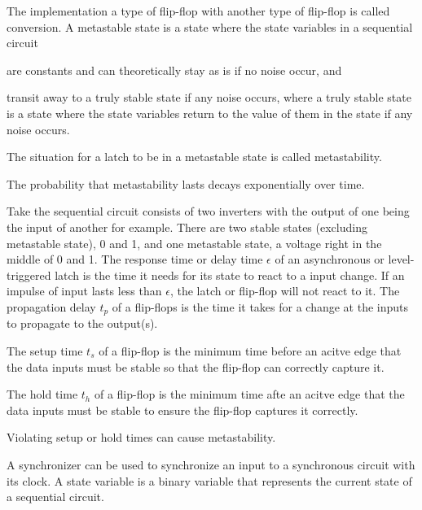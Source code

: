 \documentclass[a4paper,12pt]{report}
\begin{document}
The implementation a type of flip-flop with another type of flip-flop is called conversion.
A metastable state is a state where the state variables in a sequential circuit
\bit
\item are constants and can theoretically stay as is if no noise occur, and
\item transit away to a truly stable state if any noise occurs,
\eit
where a truly stable state is a state where the state variables return to the value of them in the state  if any noise occurs.

The situation for a latch to be in a metastable state is called metastability.

The probability that metastability lasts decays exponentially over time.

Take the sequential circuit consists of two inverters with the output of one being the input of another for example. There are two stable states (excluding metastable state), 0 and 1, and one metastable state, a voltage right in the middle of 0 and 1.
The response time or delay time $\epsilon$ of an asynchronous or level-triggered latch is the time it needs for its state to react to a input change. If an impulse of input lasts less than $\epsilon$, the latch or flip-flop will not react to it.
The propagation delay $t_p$ of a flip-flops is the time it takes for a change at the inputs to propagate to the output(s).

The setup time $t_s$ of a flip-flop is the minimum time before an acitve edge that the data inputs must be stable so that the flip-flop can correctly capture it.

The hold time $t_h$ of a flip-flop is the minimum time afte an acitve edge that the data inputs must be stable to ensure the flip-flop captures it correctly.

Violating setup or hold times can cause metastability.

A synchronizer can be used to synchronize an input to a synchronous circuit with its clock.
A state variable is a binary variable that represents the current state of a sequential circuit.
\end{document}
